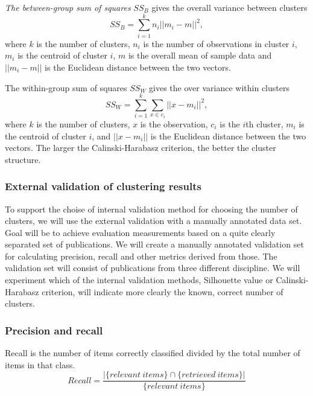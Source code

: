 \emph{The between-group sum of squares} $SS_B$ gives the overall variance
between clusters
\begin{equation}
 SS_B = \sum_{i=1}^k n_i ||m_i-m||^2,
\end{equation}
where $k$ is the number of clusters, $n_i$ is the number of 
observations in cluster $i$, $m_i$ is the centroid of cluster $i$, 
$m$ is the overall mean of sample data and $||m_i-m||$ is the 
Euclidean distance between the two vectors.

The within-group sum of squares $SS_W$ gives the over variance 
within clusters
\begin{equation}
 SS_W = \sum_{i=1}^k \sum_{x\in c_i} ||x-m_i||^2,
\end{equation}
where $k$ is the number of clusters, $x$ is the observation, 
$c_i$ is the $i$th cluster, $m_i$ is the centroid of cluster $i$, and 
$||x-m_i||$ is the Euclidean distance between the two vectors.
The larger the Calinski-Harabasz criterion, the better the 
cluster structure.


\subsubsection{External validation of clustering results}
\label{sec:ext_val}
To support the choise of internal validation method for choosing
the number of clusters, we will use the external validation 
with a manually annotated data set. 
Goal will be to achieve evaluation measurements based on a quite 
clearly separated set of publications. 
We will create a manually annotated validation set for calculating
precision, recall and other metrics derived from those.
The validation set will consist of publications from three different
discipline. We will experiment which of the internal validation
methods, Silhouette value or Calinski-Harabasz criterion, will
indicate more clearly the known, correct number of clusters.


\subsubsection{Precision and recall}
Recall is the number of items correctly classified divided by the 
total number of items in that class.
\begin{equation}
 Recall = \frac{|\{relevant\ items\} \cap \{retrieved\ items\}|} 
{\{relevant\ items\}}
\end{equation}

